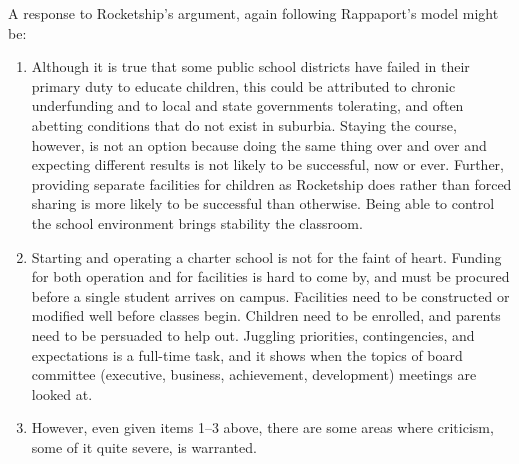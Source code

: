 A response to Rocketship's argument, again following Rappaport's model might be:
\begin{enumerate}[topsep=0.3\baselineskip,itemsep=0.25\baselineskip,resume]
  \item Although it is true that some public school districts have failed in their primary duty to educate children, this could be attributed to chronic underfunding and to local and state governments tolerating, and often abetting conditions that do not exist in suburbia. Staying the course, however, is not an option because doing the same thing over and over and expecting different results is not likely to be successful, now or ever.
  Further, providing separate facilities for children as Rocketship does rather than forced sharing is more likely to be successful than otherwise. Being able to control the school environment brings stability the classroom.

  \item Starting and operating a charter school is not for the faint of heart. Funding for both operation and for facilities is hard to come by, and must be procured before a single student arrives on campus. Facilities need to be constructed or modified well before classes begin. Children need to be enrolled, and parents need to be persuaded to help out. Juggling priorities, contingencies, and expectations is a full-time task, and it shows when the topics of board committee (executive, business, achievement, development) meetings are looked at.

  \item However, even given items 1–3 above, there are some areas where criticism, some of it quite severe, is warranted.


\end{enumerate}
